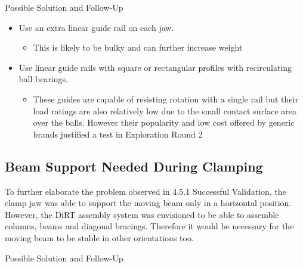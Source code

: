 Possible Solution and Follow-Up
\begin{itemize}
    \item Use an extra linear guide rail on each jaw.
    \begin{itemize}
        \item This is likely to be bulky and can further increase weight
    \end{itemize}
    \item Use linear guide rails with square or rectangular profiles with recirculating ball bearings.
    \begin{itemize}
        \item These guides are capable of resisting rotation with a single rail but their load ratings are also relatively low due to the small contact surface area over the balls. However their popularity and low cost offered by generic brands justified a test in Exploration Round 2 
    \end{itemize}
\end{itemize}
        
\subsection{Beam Support Needed During Clamping}
\label{subsection:exploration_1_beam_support_needed_during_clamping}

To further elaborate the problem observed in 4.5.1 Successful Validation, the clamp jaw was able to support the moving beam only in a horizontal position. However, the DiRT assembly system was envisioned to be able to assemble columns, beams and diagonal bracings. Therefore it would be necessary for the moving beam to be stable in other orientations too.

Possible Solution and Follow-Up

